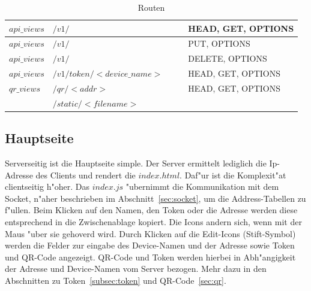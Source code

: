 \begin{table}
\begin{tabular}{|l|l|l|l|l|}
        \hline
        $api\_views$       & \tiny $/v1/$                           &                                                                                                   &                         & HEAD, GET, OPTIONS       \\
        \hline
        $api\_views$       & \tiny $/v1/$                           &                                                                                                   &                         & PUT, OPTIONS             \\
        \hline
        $api\_views$       & \tiny $/v1/$                           &                                                                                                   &                         & DELETE, OPTIONS          \\
        \hline
        $api\_views$       & \tiny $/v1/token/<device\_name>$ &                                                                                                   &                         & HEAD, GET, OPTIONS       \\
        \hline
        $qr\_views$        & \tiny $/qr/<addr>$               &                                                                                                   &                         & HEAD, GET, OPTIONS       \\
        \hline
        & \tiny $/static/<filename>$       &                                                                                                   &                         &                          \\
        \hline
    \end{tabular}
    \caption{Routen}
    \label{tab: routes}
\end{table}


\subsection{Hauptseite}\label{subsec:hauptseite}
Serverseitig ist die Hauptseite simple.
Der Server ermittelt lediglich die Ip-Adresse des Clients und rendert die $index.html$.
Daf{"u}r ist die Komplexit{"a}t clientseitig h{"o}her.
Das $index.js$ {"u}bernimmt die Kommunikation mit dem Socket, n{"a}her beschrieben im Abschnitt~\ref{sec:socket}, um die Address-Tabellen zu f{"u}llen.
Beim Klicken auf den Namen, den Token oder die Adresse werden diese entsprechend in die Zwischenablage kopiert.
Die Icons andern sich, wenn mit der Maus {"u}ber sie gehoverd wird.
Durch Klicken auf die Edit-Icons (Stift-Symbol) werden die Felder zur eingabe des Device-Namen und der Adresse sowie Token und QR-Code angezeigt.
QR-Code und Token werden hierbei in Abh{"a}ngigkeit der Adresse und Device-Namen vom Server bezogen.
Mehr dazu in den Abschnitten zu Token~\ref{subsec:token} und QR-Code~\ref{sec:qr}.

